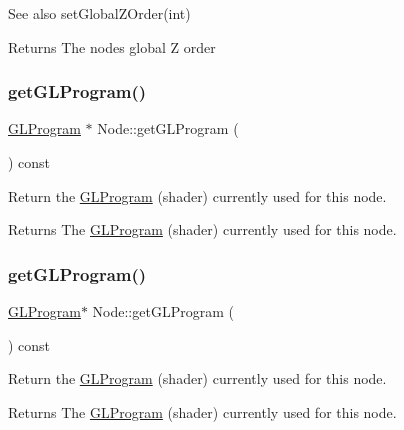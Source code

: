 \begin{DoxySeeAlso}{See also}
{\ttfamily set\+Global\+Z\+Order(int)}
\end{DoxySeeAlso}
\begin{DoxyReturn}{Returns}
The node\textquotesingle{}s global Z order 
\end{DoxyReturn}
\mbox{\label{classNode_aae25dd359a8ddb28d552b14269b69ab5}} 
\subsubsection{\texorpdfstring{get\+G\+L\+Program()}{getGLProgram()}\hspace{0.1cm}{\footnotesize\ttfamily [1/2]}}
{\footnotesize\ttfamily \hyperlink{classGLProgram}{G\+L\+Program} $\ast$ Node\+::get\+G\+L\+Program (\begin{DoxyParamCaption}{ }\end{DoxyParamCaption}) const}

Return the \hyperlink{classGLProgram}{G\+L\+Program} (shader) currently used for this node.

\begin{DoxyReturn}{Returns}
The \hyperlink{classGLProgram}{G\+L\+Program} (shader) currently used for this node. 
\end{DoxyReturn}
\mbox{\label{classNode_ac5a091621fe09d1ddc54d2f7789a71d8}} 
\subsubsection{\texorpdfstring{get\+G\+L\+Program()}{getGLProgram()}\hspace{0.1cm}{\footnotesize\ttfamily [2/2]}}
{\footnotesize\ttfamily \hyperlink{classGLProgram}{G\+L\+Program}$\ast$ Node\+::get\+G\+L\+Program (\begin{DoxyParamCaption}{ }\end{DoxyParamCaption}) const}

Return the \hyperlink{classGLProgram}{G\+L\+Program} (shader) currently used for this node.

\begin{DoxyReturn}{Returns}
The \hyperlink{classGLProgram}{G\+L\+Program} (shader) currently used for this node. 
\end{DoxyReturn}
\mbox{\label{classNode_a769007fbb26e8b6ef46096100b57bd20}} 
